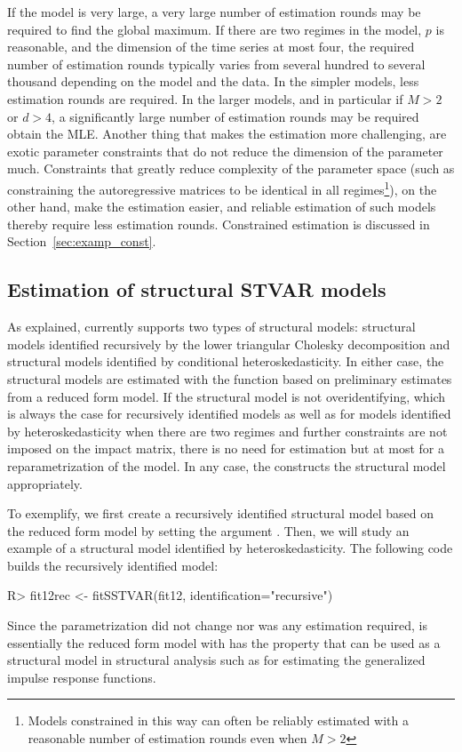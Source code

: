 \documentclass[nojss]{jss}
\begin{document}
If the model is very large, a very large number of estimation rounds may be required to find the global maximum. If there are two regimes in the model, $p$ is reasonable, and the dimension of the time series at most four, the required number of estimation rounds typically varies from several hundred to several thousand depending on the model and the data. In the simpler models, less estimation rounds are required. In the larger models, and in particular if $M>2$ or $d>4$, a significantly large number of estimation rounds may be required obtain the MLE. Another thing that makes the estimation more challenging, are exotic parameter constraints that do not reduce the dimension of the parameter much. Constraints that greatly reduce complexity of the parameter space (such as constraining the autoregressive matrices to be identical in all regimes\footnote{Models constrained in this way can often be reliably estimated with a reasonable number of estimation rounds even when $M>2$}), on the other hand, make the estimation easier, and reliable estimation of such models thereby require less estimation rounds. Constrained estimation is discussed in Section~\ref{sec:examp_const}.

\subsection{Estimation of structural STVAR models}\label{sec:estim_structural}
As explained,  currently supports two types of structural models: structural models identified recursively by the lower triangular Cholesky decomposition and structural models identified by conditional heteroskedasticity. In either case, the structural models are estimated with the function  based on preliminary estimates from a reduced form model. If the structural model is not overidentifying, which is always the case for recursively identified models as well as for models identified by heteroskedasticity when there are two regimes and further constraints are not imposed on the impact matrix, there is no need for estimation but at most for a reparametrization of the model. In any case, the  constructs the structural model appropriately.

To exemplify, we first create a recursively identified structural model based on the reduced form model  by setting the argument . Then, we will study an example of a structural model identified by heteroskedasticity. The following code builds the recursively identified model:
\begin{CodeChunk}
\begin{CodeInput}
R> fit12rec <- fitSSTVAR(fit12, identification="recursive")
\end{CodeInput}
\end{CodeChunk}
Since the parametrization did not change nor was any estimation required,  is essentially the reduced form model  with has the property that can be used as a structural model in structural analysis such as for estimating the generalized impulse response functions.
\end{document}
